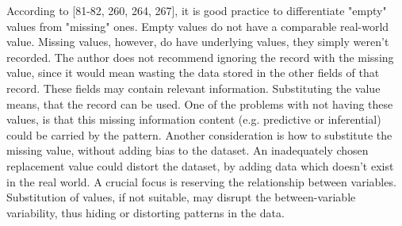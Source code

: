 According to \textcite{dataPreparationForDataMining}[81-82, 260, 264, 267], it is good practice to differentiate "empty" values from "missing" ones. Empty values do not have a comparable real-world value. Missing values, however, do have underlying values, they simply weren't recorded. The author does not recommend ignoring the record with the missing value, since it would mean wasting the data stored in the other fields of that record. These fields may contain relevant information. Substituting the value means, that the record can be used. One of the problems with not having these values, is that this missing information content (e.g. predictive or inferential) could be carried by the pattern. Another consideration is how to substitute the missing value, without adding bias to the dataset. An inadequately chosen replacement value could distort the dataset, by adding data which doesn't exist in the real world. A crucial focus is reserving the relationship between variables. Substitution of values, if not suitable, may disrupt the between-variable variability, thus hiding or distorting patterns in the data. 





